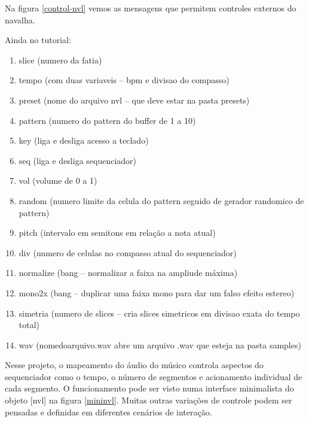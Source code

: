\documentclass[draft]{ppgmus}
\begin{document}
Na figura \ref{control-nvl} vemos as mensagens que permitem controles externos do navalha.

Ainda no tutorial:

\begin{enumerate}
\item slice (numero da fatia) 
\item tempo (com duas variaveis – bpm e divisao do compasso)
\item preset (nome do arquivo nvl – que deve estar na pasta presets)
\item pattern (numero do pattern do buffer de 1 a 10)
\item key (liga e desliga acesso a teclado)
\item seq (liga e desliga sequenciador)
\item vol (volume de 0 a 1)
\item random (numero limite da celula do pattern seguido de gerador randomico de pattern)
\item pitch (intervalo em semitons em relação a nota atual)
\item div (numero de celulas no compasso atual do sequenciador)
\item normalize (bang – normalizar a faixa na ampliude máxima)
\item mono2x (bang – duplicar uma faixa mono para dar um falso efeito estereo)
\item simetria (numero de slices – cria slices simetricos em divisao exata do tempo total)
\item wav (nomedoarquivo.wav abre um arquivo .wav que esteja na pasta samples)
\cite{navalha}
\end{enumerate}


Nesse projeto, o mapeamento do áudio do músico controla aspectos do sequenciador como o tempo,
o número de segmentos e acionamento individual de cada segmento. O funcionamento
pode ser visto numa interface minimalista do objeto [nvl] na figura \ref{mininvl}.
Muitas outras variações de controle podem
ser pensadas e definidas em diferentes cenários de interação.






% 
% 
% 
% 
% 
% 
% 
% 
% 
% 
\end{document}
